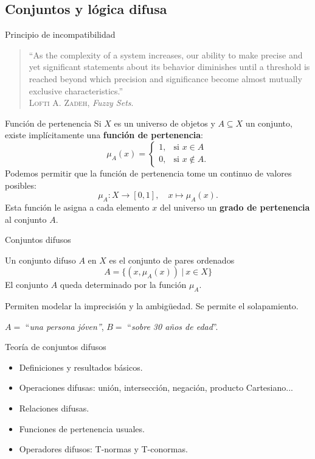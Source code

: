 \documentclass[10pt, spanish]{beamer}
\begin{document}
\subsection{Conjuntos y lógica difusa}

\begin{frame}{Principio de incompatibilidad}
\begin{quote}
	``As the complexity of a system increases, our ability to make precise and yet significant statements about its behavior diminishes until a threshold is reached beyond which precision and significance become almost mutually exclusive characteristics.''\\
	\vspace{1em}
	\textsc {Lofti A. Zadeh}, \textit{Fuzzy Sets}.
\end{quote}
\end{frame}

\begin{frame}{Función de pertenencia}
	Si $X$ es un universo de objetos y $A \subseteq X$ un conjunto, existe implícitamente una \textbf{función de pertenencia}:
\[ \mu_A(x) =
\begin{cases}
	1, & \text{si } x \in A\\
	0, & \text{si } x \notin A.
\end{cases}
\]
\pause
Podemos permitir que la función de pertenencia tome un continuo de valores posibles:
\[
\mu_A : X \longrightarrow [0,1], \quad x \mapsto \mu_A(x).
\]
Esta función le asigna a cada elemento $x$ del universo un \textbf{grado de pertenencia} al conjunto $A$.
\end{frame}

\begin{frame}{Conjuntos difusos}
\begin{definition}
	Un conjunto difuso $A$ en $X$ es el conjunto de pares ordenados
\[
A = \{ (x, \mu_A(x)) \ | \ x \in X \}
\]
El conjunto $A$ queda determinado por la función $\mu_A$.
\end{definition}
\pause
\vspace{1em}
Permiten modelar la imprecisión y la ambigüedad. Se permite el solapamiento.
\begin{example}
	$A =$ ``\textit{una persona jóven''}, $B=$ ``\textit{sobre 30 años de edad}''.
\end{example}
\end{frame}

\begin{frame}{Teoría de conjuntos difusos}

  \begin{itemize}
    \item Definiciones y resultados básicos.
    \item Operaciones difusas: unión, intersección, negación, producto Cartesiano...
    \item Relaciones difusas.
    \item Funciones de pertenencia usuales.
    \item Operadores difusos: T-normas y T-conormas.
  \end{itemize}
\end{frame}
\end{document}
